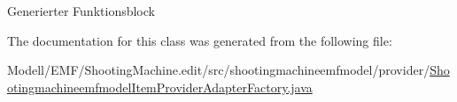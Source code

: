 Generierter Funktionsblock 

The documentation for this class was generated from the following file\-:\begin{DoxyCompactItemize}
\item 
Modell/\-E\-M\-F/\-Shooting\-Machine.\-edit/src/shootingmachineemfmodel/provider/\hyperlink{_shootingmachineemfmodel_item_provider_adapter_factory_8java}{Shootingmachineemfmodel\-Item\-Provider\-Adapter\-Factory.\-java}\end{DoxyCompactItemize}
